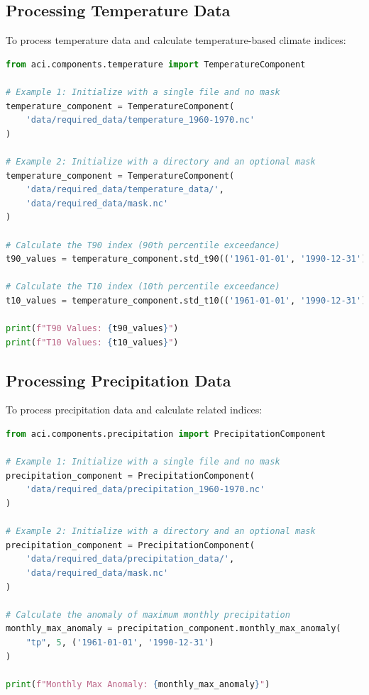 \documentclass[a4paper,12pt]{article}
\begin{document}
\subsection{Processing Temperature Data}

To process temperature data and calculate temperature-based climate indices:

\begin{lstlisting}[language=python]
from aci.components.temperature import TemperatureComponent

# Example 1: Initialize with a single file and no mask
temperature_component = TemperatureComponent(
    'data/required_data/temperature_1960-1970.nc'
)

# Example 2: Initialize with a directory and an optional mask
temperature_component = TemperatureComponent(
    'data/required_data/temperature_data/', 
    'data/required_data/mask.nc'
)

# Calculate the T90 index (90th percentile exceedance)
t90_values = temperature_component.std_t90(('1961-01-01', '1990-12-31'))

# Calculate the T10 index (10th percentile exceedance)
t10_values = temperature_component.std_t10(('1961-01-01', '1990-12-31'))

print(f"T90 Values: {t90_values}")
print(f"T10 Values: {t10_values}")
\end{lstlisting}

\subsection{Processing Precipitation Data}

To process precipitation data and calculate related indices:

\begin{lstlisting}[language=python]
from aci.components.precipitation import PrecipitationComponent

# Example 1: Initialize with a single file and no mask
precipitation_component = PrecipitationComponent(
    'data/required_data/precipitation_1960-1970.nc'
)

# Example 2: Initialize with a directory and an optional mask
precipitation_component = PrecipitationComponent(
    'data/required_data/precipitation_data/', 
    'data/required_data/mask.nc'
)

# Calculate the anomaly of maximum monthly precipitation
monthly_max_anomaly = precipitation_component.monthly_max_anomaly(
    "tp", 5, ('1961-01-01', '1990-12-31')
)

print(f"Monthly Max Anomaly: {monthly_max_anomaly}")
\end{lstlisting}
\end{document}
